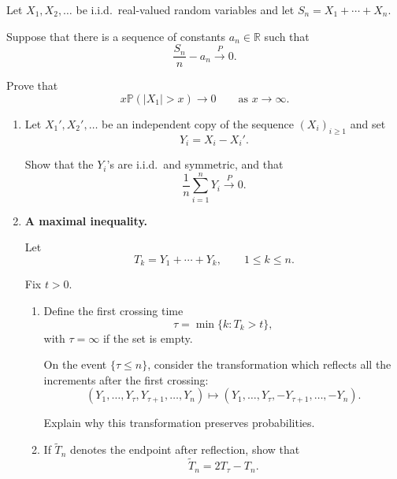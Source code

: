 \begin{quiz}

Let
\(
X_1,X_2,\ldots
\)
be i.i.d.\ real-valued random variables and let
\(
S_n=X_1+\cdots+X_n.
\)

Suppose that there is a sequence of constants
\(
a_n\in\mathbb{R}
\)
such that
\[
\frac{S_n}{n}-a_n
\xrightarrow{P}
0.
\]

Prove that
\[
\boxed{
x\mathbb{P}(|X_1|>x)
\longrightarrow0
\qquad\text{as }x\to\infty.
}
\]

\begin{enumerate}


    \item[(a)]
    Let
    \(
    X_1',X_2',\ldots
    \)
    be an independent copy of the sequence $(X_i)_{i\geq1}$ and set
    \[
    Y_i=X_i-X_i'.
    \]

    Show that the $Y_i$'s are i.i.d.\ and symmetric, and that
    \[
    \frac1n\sum_{i=1}^nY_i
    \xrightarrow{P}
    0.
    \]


    \item[(b)] \textbf{A maximal inequality.}

    Let
    \[
    T_k=Y_1+\cdots+Y_k,
    \qquad
    1\leq k\leq n.
    \]

    Fix $t>0$.

    \begin{enumerate}

        \item[(i)]
        Define the first crossing time
        \[
        \tau
        =
        \min\{k:T_k>t\},
        \]
        with $\tau=\infty$ if the set is empty.

        On the event $\{\tau\leq n\}$, consider the transformation
        which reflects all the increments after the first crossing:
        \[
        (Y_1,\ldots,Y_\tau,Y_{\tau+1},\ldots,Y_n)
        \longmapsto
        (Y_1,\ldots,Y_\tau,-Y_{\tau+1},\ldots,-Y_n).
        \]

        Explain why this transformation preserves probabilities.

        \item[(ii)]
        If $\widetilde{T}_n$ denotes the endpoint after reflection,
        show that
        \[
        \widetilde{T}_n
        =
        2T_\tau-T_n.
        \]


\end{enumerate}
\end{enumerate}
\end{quiz}
